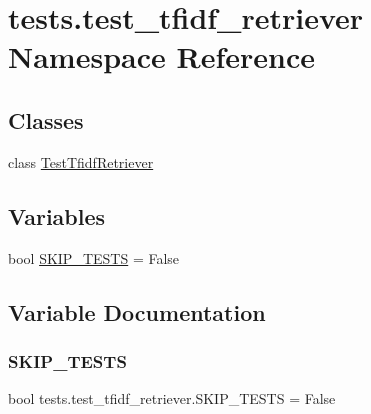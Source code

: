 \hypertarget{namespacetests_1_1test__tfidf__retriever}{}\section{tests.\+test\+\_\+tfidf\+\_\+retriever Namespace Reference}
\label{namespacetests_1_1test__tfidf__retriever}
\subsection*{Classes}
\begin{DoxyCompactItemize}
\item 
class \hyperlink{classtests_1_1test__tfidf__retriever_1_1TestTfidfRetriever}{Test\+Tfidf\+Retriever}
\end{DoxyCompactItemize}
\subsection*{Variables}
\begin{DoxyCompactItemize}
\item 
bool \hyperlink{namespacetests_1_1test__tfidf__retriever_aeb713eada76261422cbe59dad4a1d53e}{S\+K\+I\+P\+\_\+\+T\+E\+S\+TS} = False
\end{DoxyCompactItemize}


\subsection{Variable Documentation}
\mbox{\label{namespacetests_1_1test__tfidf__retriever_aeb713eada76261422cbe59dad4a1d53e}} 
\subsubsection{\texorpdfstring{S\+K\+I\+P\+\_\+\+T\+E\+S\+TS}{SKIP\_TESTS}}
{\footnotesize\ttfamily bool tests.\+test\+\_\+tfidf\+\_\+retriever.\+S\+K\+I\+P\+\_\+\+T\+E\+S\+TS = False}

